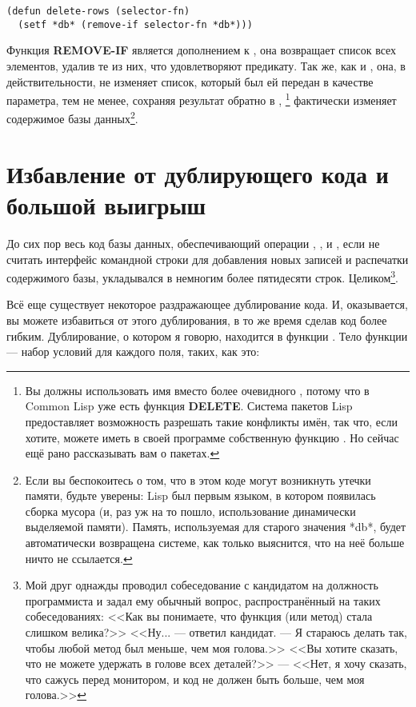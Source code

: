 \begin{lstlisting}
(defun delete-rows (selector-fn)
  (setf *db* (remove-if selector-fn *db*)))
\end{lstlisting}

Функция \textbf{REMOVE-IF} является дополнением к , она возвращает
список всех элементов, удалив те из них, что удовлетворяют предикату. Так же, как и
, она, в действительности, не изменяет список, который был ей передан
в качестве параметра, тем не менее, сохраняя результат обратно в ,
\footnote{Вы должны использовать имя  вместо более
  очевидного , потому что в Common Lisp уже есть функция
  \textbf{DELETE}. Система пакетов Lisp предоставляет возможность разрешать такие
  конфликты имён, так что, если хотите, можете иметь в своей программе собственную функцию
  . Но сейчас ещё рано рассказывать вам о пакетах.} фактически изменяет
содержимое базы данных\footnote{Если вы беспокоитесь о том, что в этом коде могут
  возникнуть утечки памяти, будьте уверены: Lisp был первым языком, в котором появилась
  сборка мусора (и, раз уж на то пошло, использование динамически выделяемой
  памяти). Память, используемая для старого значения *db*, будет автоматически возвращена
  системе, как только выяснится, что на неё больше ничто не ссылается.}.

\section{Избавление от дублирующего кода и большой выигрыш}

До сих пор весь код базы данных, обеспечивающий операции , ,
 и , если не считать интерфейс командной строки для добавления
новых записей и распечатки содержимого базы, укладывался в немногим более пятидесяти
строк. Целиком\footnote{Мой друг однажды проводил собеседование с кандидатом на должность
  программиста и задал ему обычный вопрос, распространённый на таких собеседованиях: <<Как
  вы понимаете, что функция (или метод) стала слишком велика?>> <<Ну... --- ответил
  кандидат. --- Я стараюсь делать так, чтобы любой метод был меньше, чем моя голова.>>  <<Вы
  хотите сказать, что не можете удержать в голове всех деталей?>> --- <<Нет, я хочу сказать,
  что сажусь перед монитором, и код не должен быть больше, чем моя голова.>>}.

Всё еще существует некоторое раздражающее дублирование кода. И, оказывается, вы можете
избавиться от этого дублирования, в то же время сделав код более гибким. Дублирование, о
котором я говорю, находится в функции . Тело функции  --- набор
условий для каждого поля, таких, как это:

